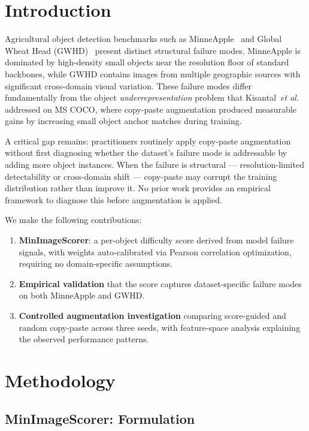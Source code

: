 \documentclass[conference]{IEEEtran}
\begin{document}
\section{Introduction}

Agricultural object detection benchmarks such as
MinneApple~\cite{hani2020minneapple} and Global Wheat
Head (GWHD)~\cite{david2021global} present distinct
structural failure modes. MinneApple is dominated by
high-density small objects near the resolution floor of
standard backbones, while GWHD contains images from
multiple geographic sources with significant cross-domain
visual variation. These failure modes differ fundamentally
from the object \textit{underrepresentation} problem that
Kisantal~\textit{et al.}~\cite{kisantal2019augmentation}
addressed on MS COCO, where copy-paste augmentation
produced measurable gains by increasing small object
anchor matches during training.

A critical gap remains: practitioners routinely apply
copy-paste augmentation without first diagnosing whether
the dataset's failure mode is addressable by adding more
object instances. When the failure is structural ---
resolution-limited detectability or cross-domain shift ---
copy-paste may corrupt the training distribution rather
than improve it. No prior work provides an empirical
framework to diagnose this before augmentation is applied.

We make the following contributions:
\begin{enumerate}
    \item \textbf{MinImageScorer}: a per-object difficulty
    score derived from model failure signals, with weights
    auto-calibrated via Pearson correlation optimization,
    requiring no domain-specific assumptions.
    \item \textbf{Empirical validation} that the score
    captures dataset-specific failure modes on both
    MinneApple and GWHD.
    \item \textbf{Controlled augmentation investigation}
    comparing score-guided and random copy-paste across
    three seeds, with feature-space analysis explaining
    the observed performance patterns.
\end{enumerate}

\section{Methodology}

\subsection{MinImageScorer: Formulation}
\end{document}
